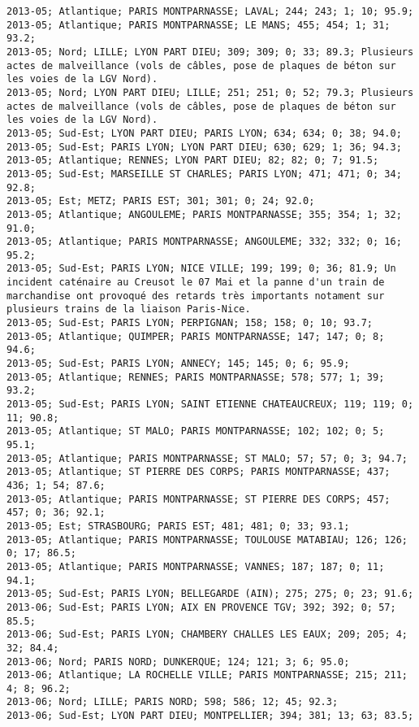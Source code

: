\documentclass{article}
\begin{document}
\begin{Verbatim}[commandchars=\\\{\}]
2013-05; Atlantique; PARIS MONTPARNASSE; LAVAL; 244; 243; 1; 10; 95.9; 
2013-05; Atlantique; PARIS MONTPARNASSE; LE MANS; 455; 454; 1; 31; 93.2; 
2013-05; Nord; LILLE; LYON PART DIEU; 309; 309; 0; 33; 89.3; Plusieurs actes de malveillance (vols de câbles, pose de plaques de béton sur les voies de la LGV Nord).
2013-05; Nord; LYON PART DIEU; LILLE; 251; 251; 0; 52; 79.3; Plusieurs actes de malveillance (vols de câbles, pose de plaques de béton sur les voies de la LGV Nord).
2013-05; Sud-Est; LYON PART DIEU; PARIS LYON; 634; 634; 0; 38; 94.0; 
2013-05; Sud-Est; PARIS LYON; LYON PART DIEU; 630; 629; 1; 36; 94.3; 
2013-05; Atlantique; RENNES; LYON PART DIEU; 82; 82; 0; 7; 91.5; 
2013-05; Sud-Est; MARSEILLE ST CHARLES; PARIS LYON; 471; 471; 0; 34; 92.8; 
2013-05; Est; METZ; PARIS EST; 301; 301; 0; 24; 92.0; 
2013-05; Atlantique; ANGOULEME; PARIS MONTPARNASSE; 355; 354; 1; 32; 91.0; 
2013-05; Atlantique; PARIS MONTPARNASSE; ANGOULEME; 332; 332; 0; 16; 95.2; 
2013-05; Sud-Est; PARIS LYON; NICE VILLE; 199; 199; 0; 36; 81.9; Un incident caténaire au Creusot le 07 Mai et la panne d'un train de marchandise ont provoqué des retards très importants notament sur plusieurs trains de la liaison Paris-Nice.
2013-05; Sud-Est; PARIS LYON; PERPIGNAN; 158; 158; 0; 10; 93.7; 
2013-05; Atlantique; QUIMPER; PARIS MONTPARNASSE; 147; 147; 0; 8; 94.6; 
2013-05; Sud-Est; PARIS LYON; ANNECY; 145; 145; 0; 6; 95.9; 
2013-05; Atlantique; RENNES; PARIS MONTPARNASSE; 578; 577; 1; 39; 93.2; 
2013-05; Sud-Est; PARIS LYON; SAINT ETIENNE CHATEAUCREUX; 119; 119; 0; 11; 90.8; 
2013-05; Atlantique; ST MALO; PARIS MONTPARNASSE; 102; 102; 0; 5; 95.1; 
2013-05; Atlantique; PARIS MONTPARNASSE; ST MALO; 57; 57; 0; 3; 94.7; 
2013-05; Atlantique; ST PIERRE DES CORPS; PARIS MONTPARNASSE; 437; 436; 1; 54; 87.6; 
2013-05; Atlantique; PARIS MONTPARNASSE; ST PIERRE DES CORPS; 457; 457; 0; 36; 92.1; 
2013-05; Est; STRASBOURG; PARIS EST; 481; 481; 0; 33; 93.1; 
2013-05; Atlantique; PARIS MONTPARNASSE; TOULOUSE MATABIAU; 126; 126; 0; 17; 86.5; 
2013-05; Atlantique; PARIS MONTPARNASSE; VANNES; 187; 187; 0; 11; 94.1; 
2013-05; Sud-Est; PARIS LYON; BELLEGARDE (AIN); 275; 275; 0; 23; 91.6; 
2013-06; Sud-Est; PARIS LYON; AIX EN PROVENCE TGV; 392; 392; 0; 57; 85.5; 
2013-06; Sud-Est; PARIS LYON; CHAMBERY CHALLES LES EAUX; 209; 205; 4; 32; 84.4; 
2013-06; Nord; PARIS NORD; DUNKERQUE; 124; 121; 3; 6; 95.0; 
2013-06; Atlantique; LA ROCHELLE VILLE; PARIS MONTPARNASSE; 215; 211; 4; 8; 96.2; 
2013-06; Nord; LILLE; PARIS NORD; 598; 586; 12; 45; 92.3; 
2013-06; Sud-Est; LYON PART DIEU; MONTPELLIER; 394; 381; 13; 63; 83.5; 

\end{Verbatim}
\end{document}
